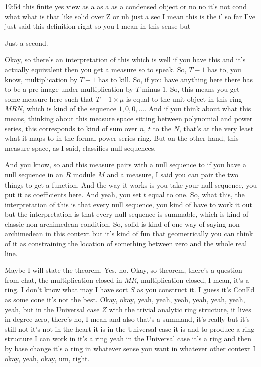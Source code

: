 \begin{unfinished}{19:54}
 this finite yes view as a as a as a condensed object or no no it's not cond what what is that like solid over Z or uh just a sec I mean this is the i' so far I've just said this definition right so you I mean in this sense but

Just a second.

Okay, so there's an interpretation of this which is well if you have this and it's actually equivalent then you get a measure so to speak. So, $T - 1$ has to, you know, multiplication by $T - 1$ has to kill. So, if you have anything here there has to be a pre-image under multiplication by $T$ minus $1$. So, this means you get some measure here such that $T - 1 \times \mu$ is equal to the unit object in this ring $MRN$, which is kind of the sequence $1, 0, 0, \ldots$. And if you think about what this means, thinking about this measure space sitting between polynomial and power series, this corresponds to kind of sum over $n$, $t$ to the $N$, that's at the very least what it maps to in the formal power series ring. But on the other hand, this measure space, as I said, classifies null sequences.

And you know, so and this measure pairs with a null sequence to if you have a null sequence in an $R$ module $M$ and a measure, I said you can pair the two things to get a function. And the way it works is you take your null sequence, you put it as coefficients here. And yeah, you set $t$ equal to one. So, what this, the interpretation of this is that every null sequence, you kind of have to work it out but the interpretation is that every null sequence is summable, which is kind of classic non-archimedean condition. So, solid is kind of one way of saying non-archimedean in this context but it's kind of fun that geometrically you can think of it as constraining the location of something between zero and the whole real line.

Maybe I will state the theorem. Yes, no. Okay, so theorem, there's a question from chat, the multiplication closed in $MR$, multiplication closed, I mean, it's a ring. I don't know what may I have sort $S$ as you construct it. I guess it's ConEd as some cone it's not the best. Okay, okay, yeah, yeah, yeah, yeah, yeah, yeah, yeah, but in the Universal case $Z$ with the trivial analytic ring structure, it lives in degree zero, there's no, I mean and also that's a summand, it's really but it's still not it's not in the heart it is in the Universal case it is and to produce a ring structure I can work in it's a ring yeah in the Universal case it's a ring and then by base change it's a ring in whatever sense you want in whatever other context I okay, yeah, okay, um, right. 


\end{unfinished}
